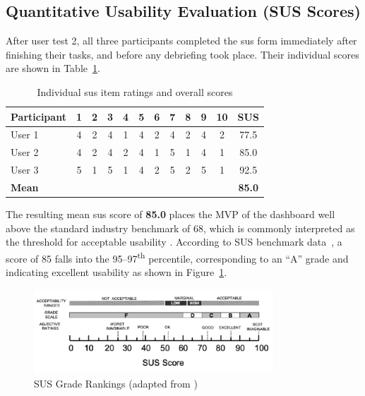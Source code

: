\subsection{Quantitative Usability Evaluation (SUS Scores)}
\label{subsec:quant_sus}


After user test 2, all three participants completed the \acrshort{sus} form immediately after finishing their tasks, and before any debriefing took place. Their individual scores are shown in Table~\ref{tab:sus-scores}.

\begin{table}[H]
\centering
\begin{tabular}{@{}lccccccccccc@{}}
\toprule
\textbf{Participant} & \textbf{1} & \textbf{2} & \textbf{3} & \textbf{4} & \textbf{5} & \textbf{6} & \textbf{7} & \textbf{8} & \textbf{9} & \textbf{10} & \textbf{SUS} \\
\midrule
User 1 & 4 & 2 & 4 & 1 & 4 & 2 & 4 & 2 & 4 & 2 & 77.5 \\
User 2 & 4 & 2 & 4 & 2 & 4 & 1 & 5 & 1 & 4 & 1 & 85.0 \\
User 3 & 5 & 1 & 5 & 1 & 4 & 2 & 5 & 2 & 5 & 1 & 92.5 \\
\midrule
\textbf{Mean} &  &  &  &  &  &  &  &  &  &  & \textbf{85.0} \\
\bottomrule
\end{tabular}
\caption{Individual \acrshort{sus} item ratings and overall scores}
\label{tab:sus-scores}
\end{table}

The resulting mean \acrshort{sus} score of \textbf{85.0} places the MVP of the dashboard well above the standard industry benchmark of 68, which is commonly interpreted as the threshold for acceptable usability \autocite{MeasuringSUS2011}. According to SUS benchmark data~\autocite{Bangor2009}, a score of 85 falls into the 95–97\textsuperscript{th} percentile, corresponding to an “A” grade and indicating excellent usability as shown in Figure~\ref{fig:sus_scores}.

\begin{figure}[H]
    \centering
    \includegraphics[width=0.8\textwidth]{figures/Grade-rankings-of-SUS-scores-from-An-Empirical-Evaluation-of-the-System-Usability.png}
    \caption{SUS Grade Rankings (adapted from \cite{Bangor2009})}
    \label{fig:sus_scores}
\end{figure}



